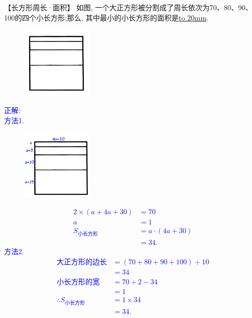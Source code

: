 \item {
    【长方形周长·面积】
    如图, 一个大正方形被分割成了周长依次为70、80、90、100的四个小长方形;那么, 其中最小的小长方形的面积是\underline{\hbox to 20mm{}}.
    \begin{figure}[H] 
        \centering
        \includegraphics[width=0.3\textwidth]{./pics/Chapter_2/4.png}
    \end{figure}
    \ifshowSolution 
        \fangsong{}\textcolor{blue}{
            正解: \\
            方法1. \\
            \begin{figure}[H] 
                \centering
                \includegraphics[width=0.3\textwidth]{./pics/Chapter_2/seikai_4.png}
            \end{figure}
            \begin{align*}
                2\times (a+4a+30) &= 70 \\
                a &= 1 \\
                S_{小长方形} &= a\cdot (4a+30)\\
                &= 34.
            \end{align*}
            方法2.\\
            \begin{align*}
                大正方形的边长 &=(70+80+90+100)\div 10 \\
                 &= 34\\
                小长方形的宽 &= 70\div 2 - 34\\
                &= 1\\
                \therefore S_{小长方形} &= 1\times 34\\
                &= 34.
            \end{align*}
        }
    \else
        \vspace{1cm}
    \fi
}


